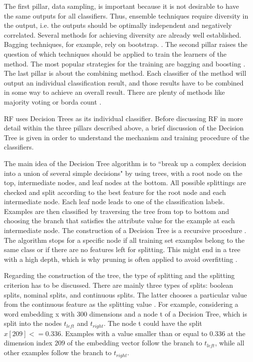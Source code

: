 \documentclass[12pt, a4paper, titlepage]{article}
\begin{document}
The first pillar, data sampling, is important because it is not desirable to have the same outputs for all classifiers. Thus, ensemble techniques require diversity in the output, i.e. the outputs should be optimally independent and negatively correlated. Several methods for achieving diversity are already well established. Bagging techniques, for example, rely on bootstrap. \citep{polikar2012}. The second pillar raises the question of which techniques should be applied to train the learners of the method. The most popular strategies for the training are bagging and boosting \citep{polikar2012}. The last pillar is about the combining method. Each classifier of the method will output an individual classification result, and those results have to be combined in some way to achieve an overall result. There are plenty of methods like majority voting or borda count \citep{polikar2012}.

\ac{RF} uses Decision Trees as its individual classifier. Before discussing \ac{RF} in more detail within the three pillars described above, a brief discussion of the Decision Tree is given in order to understand the mechanism and training procedure of the classifiers. 

The main idea of the Decision Tree algorithm is to ``break up a complex decision into a union of several simple decisions" \citep[660]{safavian1991} by using trees, with a root node on the top, intermediate nodes, and leaf nodes at the bottom. All possible splittings are checked and split according to the best feature for the root node and each intermediate node. Each leaf node leads to one of the classification labels. Examples are then classified by traversing the tree from top to bottom and choosing the branch that satisfies the attribute value for the example at each intermediate node. The construction of a Decision Tree is a recursive procedure \citep{Berthold2020, xia2008, cutler2012}. The algorithm stops for a specific node if all training set examples belong to the same class or if there are no features left for splitting. This might end in a tree with a high depth, which is why pruning is often applied to avoid overfitting \citep{Berthold2020}.


Regarding the construction of the tree, the type of splitting and the splitting criterion has to be discussed. There are mainly three types of splits: boolean splits, nominal splits, and continuous splits. The latter chooses a particular value from the continuous feature as the splitting value \citep{cutler2012, Berthold2020}. For example, considering a word embedding x with 300 dimensions and a node t of a Decision Tree, which is split into the nodes $t_{left}$ and $t_{right}$. The node t could have the split $x[209] <= 0.336$. Examples with a value smaller than or equal to $0.336$ at the dimension index $209$ of the embedding vector follow the branch to $t_{left}$, while all other examples follow the branch to $t_{right}$.
\end{document}
